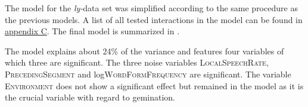 The model for the \textit{ly-}data set was simplified according to the same procedure as the  previous models. A list of all tested interactions in the model can be found in \hyperref[Appendix C: Summaries of tested interactions in corpus study]{appendix C}. 
The final model is summarized in .


\begin{table}
	\caption{Summary of linear model for variables predicting the  duration of [l] in -suffixed words}
	\label{tbl: corpus summary model ly}
	
	
\end{table}





The model explains about 24\% of the variance and features four variables of which three are significant. The three noise variables \textsc{LocalSpeechRate}, \textsc{PrecedingSegment} and log\textsc{WordFormFrequency} are significant. 
The variable \textsc{Environment} does not show a significant effect but remained in the model as it is the crucial variable with regard to gemination.

